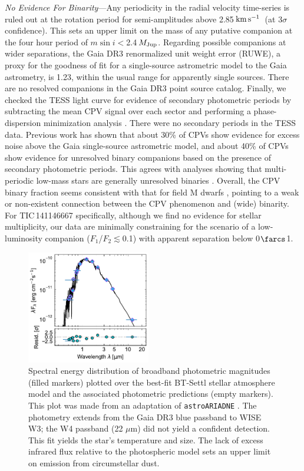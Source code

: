 \documentclass[11pt,twocolumn,tighten,linenumbers]{aastex7}
\newcommand{\kms}{\ensuremath{\rm km\,s^{-1}}}
\begin{document}
{\it No Evidence For Binarity}---Any periodicity in the radial
velocity time-series is ruled out at the rotation period for
semi-amplitudes above 2.85\,\kms\ (at 3$\sigma$ confidence).  This
sets an upper limit on the mass of any putative companion at the four
hour period of $m \sin i $$<$2.4\,$M_{\rm Jup}$.  Regarding possible
companions at wider separations, the Gaia DR3 renormalized unit weight
error (RUWE), a proxy for the goodness of fit for a single-source
astrometric model to the Gaia astrometry, is 1.23, within the usual
range for apparently single sources.  There are no resolved companions
in the Gaia DR3 point source catalog.  Finally, we checked the TESS
light curve for evidence of secondary photometric periods by
subtracting the mean CPV signal over each sector and performing a
phase-dispersion minimization analysis
\citep{Stellingwerf1978,2021zndo...1011188B}.  There were no secondary
periods in the TESS data.  Previous work \citep{Bouma2024} has shown
that about 30\% of CPVs show evidence for excess noise above the Gaia
single-source astrometric model, and about 40\% of CPVs show evidence
for unresolved binary companions based on the presence of secondary
photometric periods.  This agrees with analyses showing that
multi-periodic low-mass stars are generally unresolved binaries
\citep{Tokovinin2018}.  Overall, the CPV binary fraction seems
consistent with that for field M dwarfs \citep{Winters2019}, pointing
to a weak or non-existent connection between the CPV phenomenon and
(wide) binarity.  For TIC\,141146667 specifically, although we find no
evidence for stellar multiplicity, our data are minimally constraining
for the scenario of a low-luminosity companion
($F_1$/$F_2$$\lesssim$0.1) with apparent separation below 0$\farcs$1.


\begin{figure}[!t]
  \centering
  \includegraphics[width=0.48\textwidth]{figures/sf4.pdf}
  \caption{
    Spectral energy distribution of broadband photometric magnitudes
    (filled markers) plotted over the best-fit BT-Settl stellar
    atmosphere model \citep{Allard2012} and the associated photometric
    predictions (empty markers).  This plot was made from an
    adaptation of \texttt{astroARIADNE} \citep{Vines2022}.  The
    photometry extends from the Gaia DR3 blue passband to WISE W3;
    the W4 passband (22 $\mu$m) did not yield a confident detection.
    This fit yields the star's temperature and size.  The lack of
    excess infrared flux relative to the photospheric model sets an
    upper limit on emission from circumstellar dust.
    }
  \label{fig:sed}
\end{figure}
\end{document}
